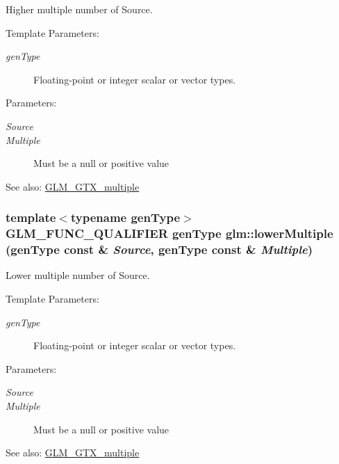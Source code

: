 Higher multiple number of Source.

\begin{Desc}
\item[Template Parameters:]
\begin{description}
\item[{\em genType}]Floating-point or integer scalar or vector types. \end{description}
\end{Desc}
\begin{Desc}
\item[Parameters:]
\begin{description}
\item[{\em Source}]\item[{\em Multiple}]Must be a null or positive value\end{description}
\end{Desc}
\begin{Desc}
\item[See also:]\hyperlink{group__gtx__multiple}{GLM\_\-GTX\_\-multiple} \end{Desc}
\hypertarget{group__gtx__multiple_gecccd82257351764e3c2bec8973458e3}{
\subsubsection[lowerMultiple]{\setlength{\rightskip}{0pt plus 5cm}template$<$typename genType$>$ GLM\_\-FUNC\_\-QUALIFIER genType glm::lowerMultiple (genType const \& {\em Source}, \/  genType const \& {\em Multiple})}}
\label{group__gtx__multiple_gecccd82257351764e3c2bec8973458e3}


Lower multiple number of Source.

\begin{Desc}
\item[Template Parameters:]
\begin{description}
\item[{\em genType}]Floating-point or integer scalar or vector types. \end{description}
\end{Desc}
\begin{Desc}
\item[Parameters:]
\begin{description}
\item[{\em Source}]\item[{\em Multiple}]Must be a null or positive value\end{description}
\end{Desc}
\begin{Desc}
\item[See also:]\hyperlink{group__gtx__multiple}{GLM\_\-GTX\_\-multiple} \end{Desc}

